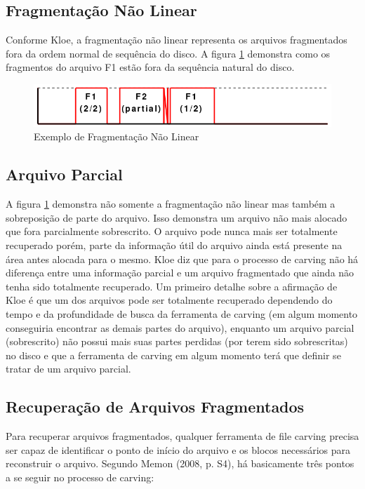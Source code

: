 \subsection{Fragmentação Não Linear}
Conforme Kloe, a fragmentação não linear representa os arquivos fragmentados fora da ordem normal de sequência do disco. A figura \ref{fig:fragnaolinear} demonstra como os fragmentos do arquivo F1 estão fora da sequência natural do disco.

\begin{figure}[htp]
  \centering
  \includegraphics[scale=0.6]{figuras/fragnaolinear.png}
  \caption{Exemplo de Fragmentação Não Linear}
  \label{fig:fragnaolinear}
\end{figure}

\subsection{Arquivo Parcial}
A figura \ref{fig:fragnaolinear} demonstra não somente a fragmentação não linear mas também a sobreposição de parte do arquivo. Isso demonstra um arquivo não mais alocado que fora parcialmente sobrescrito. O arquivo pode nunca mais ser totalmente recuperado porém, parte da informação útil do arquivo ainda está presente na área antes alocada para o mesmo. Kloe diz que para o processo de carving não há diferença entre uma informação parcial e um arquivo fragmentado que ainda não tenha sido totalmente recuperado. Um primeiro detalhe sobre a afirmação de Kloe é que um dos arquivos pode ser totalmente recuperado dependendo do tempo e da profundidade de busca da ferramenta de carving (em algum momento conseguiria encontrar as demais partes do arquivo), enquanto um arquivo parcial (sobrescrito) não possui mais suas partes perdidas (por terem sido sobrescritas) no disco e que a ferramenta de carving em algum momento terá que definir se tratar de um arquivo parcial.

\subsection{Recuperação de Arquivos Fragmentados}
Para recuperar arquivos fragmentados, qualquer ferramenta de file carving precisa ser capaz de identificar o ponto de início do arquivo e os blocos necessários para reconstruir o arquivo. Segundo Memon (2008, p. S4), há basicamente três pontos a se seguir no processo de carving:

